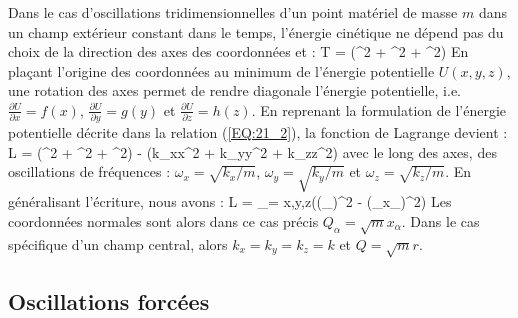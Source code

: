 Dans le cas d'oscillations tridimensionnelles d'un point mat\'eriel de masse $m$ dans un champ ext\'erieur constant dans le temps, l'\'energie cin\'etique ne d\'epend pas du choix de la direction des axes des coordonn\'ees et :
\benn
	T = (^{2} + ^{2} + ^{2})
\eenn
En pla\c{c}ant l'origine des coordonn\'ees au minimum de l'\'energie potentielle $U(x,y,z)$, une rotation des axes permet de rendre diagonale l'\'energie potentielle, i.e. $\frac{\partial U}{\partial x} = f(x)$, $\frac{\partial U}{\partial y} = g(y)$ et $\frac{\partial U}{\partial z} = h(z)$. En reprenant la formulation de l'\'energie potentielle d\'ecrite dans la relation (\ref{EQ:21_2}), la fonction de Lagrange devient :
\be
	L = (^{2} + ^{2} + ^{2}) - (k_{x}x^{2} + k_{y}y^{2} + k_{z}z^{2}) \label{EQ:23_14}
\ee
avec le long des axes, des oscillations de fr\'equences : $\omega_{x} = \sqrt{k_{x}/m}$, $\omega_{y} = \sqrt{k_{y}/m}$ et $\omega_{z} = \sqrt{k_{z}/m}$. En g\'en\'eralisant l'\'ecriture, nous avons :
\benn
	L = \sum_{\alpha = x,y,z}\left((_{\alpha})^{2} - (\omega_{\alpha}x_{\alpha})^{2}\right)
\eenn
Les coordonn\'ees normales sont alors dans ce cas pr\'ecis $Q_{\alpha} = \sqrt{m}x_{\alpha}$. Dans le cas sp\'ecifique d'un champ central, alors $k_{x} = k_{y} = k_{z} = k$ et $Q = \sqrt{m}r$.

\subsection{Oscillations forc\'ees}

